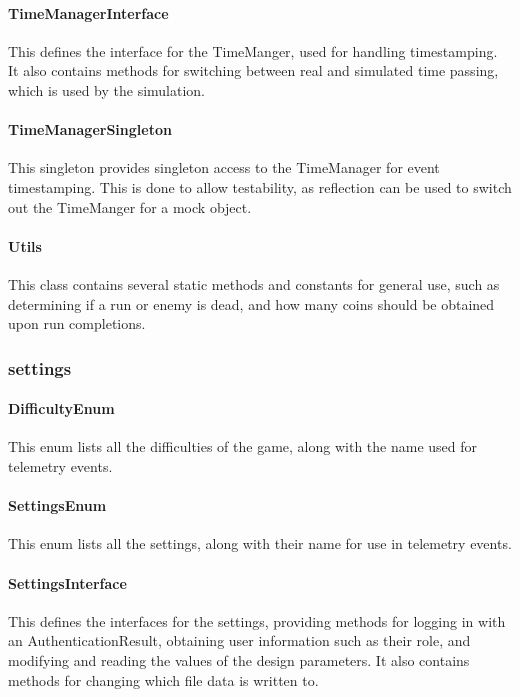 \documentclass[11pt]{article}
\begin{document}
\paragraph{TimeManagerInterface}
This defines the interface for the TimeManger, used for handling timestamping. It also contains methods for switching between real and simulated time passing, which is used by the simulation.

\paragraph{TimeManagerSingleton}
This singleton provides singleton access to the TimeManager for event timestamping. This is done to allow testability, as reflection can be used to switch out the TimeManger for a mock object. 


\paragraph{Utils}
This class contains several static methods and constants for general use, such as determining if a run or enemy is dead, and how many coins should be obtained upon run completions. 

\subsubsection{settings}

\paragraph{DifficultyEnum}
This enum lists all the difficulties of the game, along with the name used for telemetry events. 

\paragraph{SettingsEnum}
This enum lists all the settings, along with their name for use in telemetry events.

\paragraph{SettingsInterface}
This defines the interfaces for the settings, providing methods for logging in with an AuthenticationResult, obtaining user information such as their role, and modifying and reading the values of the design parameters. It also contains methods for changing which file data is written to.
\end{document}
